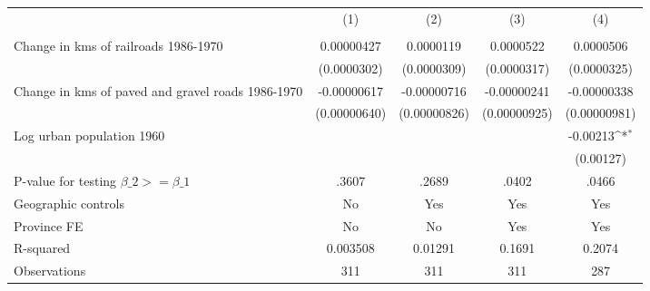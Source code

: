 {
\def\sym#1{\ifmmode^{#1}\else\(^{#1}\)\fi}
\begin{tabular}{l*{4}{c}}
\hline\hline
                &\multicolumn{1}{c}{(1)}&\multicolumn{1}{c}{(2)}&\multicolumn{1}{c}{(3)}&\multicolumn{1}{c}{(4)}\\
                &\multicolumn{1}{c}{}&\multicolumn{1}{c}{}&\multicolumn{1}{c}{}&\multicolumn{1}{c}{}\\
\hline
Change in kms of railroads 1986-1970&0.00000427         &0.0000119         &0.0000522         &0.0000506         \\
                &(0.0000302)         &(0.0000309)         &(0.0000317)         &(0.0000325)         \\
[1em]
Change in kms of paved and gravel roads 1986-1970&-0.00000617         &-0.00000716         &-0.00000241         &-0.00000338         \\
                &(0.00000640)         &(0.00000826)         &(0.00000925)         &(0.00000981)         \\
[1em]
Log urban population 1960&                  &                  &                  & -0.00213\sym{*}  \\
                &                  &                  &                  &(0.00127)         \\
\hline
P-value for testing $\beta\_{2} >= \beta\_{1}$&    .3607         &    .2689         &    .0402         &    .0466         \\
Geographic controls&       No         &      Yes         &      Yes         &      Yes         \\
Province FE     &       No         &       No         &      Yes         &      Yes         \\
R-squared       & 0.003508         &  0.01291         &   0.1691         &   0.2074         \\
Observations    &      311         &      311         &      311         &      287         \\
\hline\hline
\end{tabular}
}
